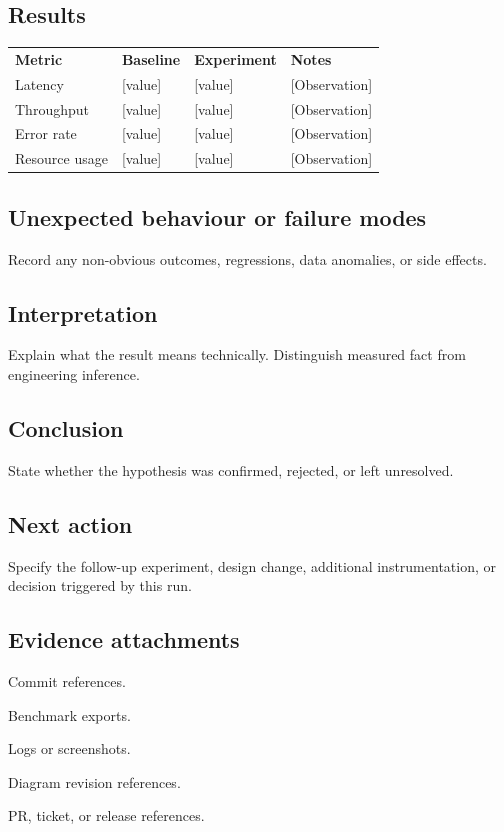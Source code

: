 \documentclass[11pt]{article}
\begin{document}
\subsection{Results}
\begin{xltabular}{\textwidth}{L{3.8cm}C{2.6cm}C{2.6cm}Y}
\textbf{Metric} & \textbf{Baseline} & \textbf{Experiment} & \textbf{Notes} \\
Latency & {[value]} & {[value]} & {[Observation]} \\
Throughput & {[value]} & {[value]} & {[Observation]} \\
Error rate & {[value]} & {[value]} & {[Observation]} \\
Resource usage & {[value]} & {[value]} & {[Observation]} \\
\end{xltabular}

\subsection{Unexpected behaviour or failure modes}
Record any non-obvious outcomes, regressions, data anomalies, or side effects.

\subsection{Interpretation}
Explain what the result means technically. Distinguish measured fact from engineering inference.

\subsection{Conclusion}
State whether the hypothesis was confirmed, rejected, or left unresolved.

\subsection{Next action}
Specify the follow-up experiment, design change, additional instrumentation, or decision triggered by this run.

\subsection{Evidence attachments}
\begin{RDChecklist}
\item Commit references.
\item Benchmark exports.
\item Logs or screenshots.
\item Diagram revision references.
\item PR, ticket, or release references.
\end{RDChecklist}
\end{document}
